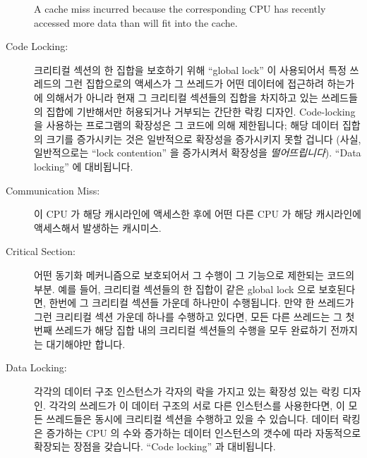 \begin{description}
	A cache miss incurred because the corresponding CPU has recently
	accessed more data than will fit into the cache.
	\fi
\item[Code Locking:]
	크리티컬 섹션의 한 집합을 보호하기 위해 ``global lock'' 이 사용되어서
	특정 쓰레드의 그런 집합으로의 액세스가 그 쓰레드가 어떤 데이터에
	접근하려 하는가에 의해서가 아니라 현재 그 크리티컬 섹션들의 집합을
	차지하고 있는 쓰레드들의 집합에 기반해서만 허용되거나 거부되는 간단한
	락킹 디자인.
	Code-locking 을 사용하는 프로그램의 확장성은 그 코드에 의해 제한됩니다;
	해당 데이터 집합의 크기를 증가시키는 것은 일반적으로 확장성을
	증가시키지 못할 겁니다 (사실, 일반적으로는 ``lock contention'' 을
	증가시켜서 확장성을 \emph{떨어뜨립니다}).
	``Data locking'' 에 대비됩니다.
	\iffalse

	A simple locking design in which a ``global lock'' is used to protect
	a set of critical sections, so that access by a given thread
	to that set is
	granted or denied based only on the set of threads currently
	occupying the set of critical sections, not based on what
	data the thread intends to access.
	The scalability of a code-locked program is limited by the code;
	increasing the size of the data set will normally not increase
	scalability (in fact, will typically \emph{decrease} scalability
	by increasing ``lock contention'').
	Contrast with ``data locking''.
	\fi
\item[Communication Miss:]
	이 CPU 가 해당 캐시라인에 액세스한 후에 어떤 다른 CPU 가 해당
	캐시라인에 액세스해서 발생하는 캐시미스.
	\iffalse

	A cache miss incurred because the some other CPU has written to
	the cache line since the last time this CPU accessed it.
	\fi
\item[Critical Section:]
	어떤 동기화 메커니즘으로 보호되어서 그 수행이 그 기능으로 제한되는
	코드의 부분.
	예를 들어, 크리티컬 섹션들의 한 집합이 같은 global lock 으로
	보호된다면, 한번에 그 크리티컬 섹션들 가운데 하나만이 수행됩니다.
	만약 한 쓰레드가 그런 크리티컬 섹션 가운데 하나를 수행하고 있다면, 모든
	다른 쓰레드는 그 첫번째 쓰레드가 해당 집합 내의 크리티컬 섹션들의
	수행을 모두 완료하기 전까지는 대기해야만 합니다.
	\iffalse

	A section of code guarded by some synchronization mechanism,
	so that its execution constrained by that primitive.
	For example, if a set of critical sections are guarded by
	the same global lock, then only one of those critical sections
	may be executing at a given time.
	If a thread is executing in one such critical section,
	any other threads must wait until the first thread completes
	before executing any of the critical sections in the set.
	\fi
\item[Data Locking:]
	각각의 데이터 구조 인스턴스가 각자의 락을 가지고 있는 확장성 있는 락킹
	디자인.
	각각의 쓰레드가 이 데이터 구조의 서로 다른 인스턴스를 사용한다면, 이
	모든 쓰레드들은 동시에 크리티컬 섹션을 수행하고 있을 수 있습니다.
	데이터 락킹은 증가하는 CPU 의 수와 증가하는 데이터 인스턴스의 갯수에
	따라 자동적으로 확장되는 장점을 갖습니다.
	``Code locking'' 과 대비됩니다.
	\iffalse


\end{description}
